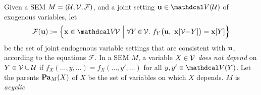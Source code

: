 Given a SEM $M = (\mathcal U, \mathcal V, \mathcal F)$, and a joint setting $\mat u \in \V(\U)$ of exogenous variables, let
\[
    \mathcal F(\mat u)
    := \Big\{
        \mat x \in \V\! \enV ~\Big|~
            \forall Y \,{\in}\, \enV.~
            f_{Y}\big(\mat u,~ \mat x[ \enV {-} Y ]\big) = \mat x[Y]
    \Big\}
\]
be the set of joint endogenous variable settings that are consistent with $\mathbf u$, according to the equations $\mathcal F$.
%
In a SEM $M$, a variable $X \in \mathcal V$ \emph{does not depend} on $Y \in \mathcal V\cup\mathcal U$ if $f_X(\ldots, y, \ldots) =
f_X(\ldots, y', \ldots)$ for all $y, y' \in \V(Y)$.
Let the parents $\mathop{\mathbf{Pa}}_{M}(X)
$
of $X$ be the set of variables on which $X$ depends.
$M$ is \emph{acyclic}
